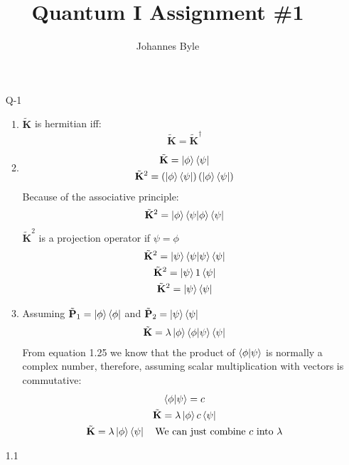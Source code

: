 \documentclass[12pt]{article}
\title{Quantum I Assignment \#1}
\author{Johannes Byle}
\newcommand{\op}[1]{\tilde{\mathbf{#1}}}
\begin{document}
    \maketitle
    \begin{enumerate}
        \item[Q-1]
        \begin{enumerate}
            \item $\op{K}$ is hermitian iff:
            \[
                \op{K}=\op{K}^{\dagger}
            \]
            \item
            \begin{gather*}
                \op{K}=\ket{\phi}\bra{\psi}\\
                \op{K}^2=\left(\ket{\phi}\bra{\psi}\right)\left(\ket{\phi}\bra{\psi}\right)
            \end{gather*}
            Because of the associative principle:
            \begin{gather*}
                \op{K}^2=\ket{\phi}\braket{\psi|\phi}\bra{\psi}
            \end{gather*}
            $\op{K}^2$ is a projection operator if $\psi=\phi$
            \begin{gather*}
                \op{K}^2=\ket{\psi}\braket{\psi|\psi}\bra{\psi}\\
                \op{K}^2=\ket{\psi}1\bra{\psi}\\
                \op{K}^2=\ket{\psi}\bra{\psi}
            \end{gather*}
            \item
            Assuming $\op{P}_1=\ket{\phi}\bra{\phi}$ and $\op{P}_2=\ket{\psi}\bra{\psi}$
            \begin{gather*}
                \op{K}=\lambda\ket{\phi}\braket{\phi|\psi}\bra{\psi}
            \end{gather*}
            From equation 1.25 we know that the product of $\braket{\phi|\psi}$ is normally a complex number, therefore, assuming scalar multiplication with vectors is commutative:
            \begin{gather*}
                \braket{\phi|\psi}=c\\
                \op{K}=\lambda\ket{\phi}c\bra{\psi}\\
                \op{K}=\lambda\ket{\phi}\bra{\psi}\quad\text{We can just combine $c$ into $\lambda$}
            \end{gather*}
        \end{enumerate}
        \item[1.1]

\end{enumerate}
\end{document}
